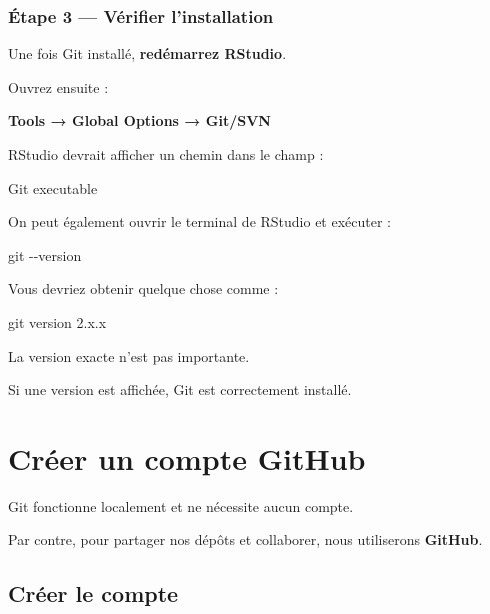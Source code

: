 \documentclass[
  letterpaper,
  DIV=11,
  numbers=noendperiod]{scrreprt}
\newenvironment{Shaded}{\begin{snugshade}}{\end{snugshade}}
\newcommand{\AttributeTok}[1]{\textcolor[rgb]{0.40,0.45,0.13}{#1}}
\newcommand{\FunctionTok}[1]{\textcolor[rgb]{0.28,0.35,0.67}{#1}}
\newcommand{\NormalTok}[1]{\textcolor[rgb]{0.00,0.23,0.31}{#1}}
\begin{document}
\subsection{Étape 3 --- Vérifier
l'installation}\label{uxe9tape-3-vuxe9rifier-linstallation}

Une fois Git installé, \textbf{redémarrez RStudio}.

Ouvrez ensuite :

\textbf{Tools → Global Options → Git/SVN}

RStudio devrait afficher un chemin dans le champ :

\begin{Shaded}
\begin{Highlighting}[]
\NormalTok{Git executable}
\end{Highlighting}
\end{Shaded}

On peut également ouvrir le terminal de RStudio et exécuter :

\begin{Shaded}
\begin{Highlighting}[]
\FunctionTok{git} \AttributeTok{{-}{-}version}
\end{Highlighting}
\end{Shaded}

Vous devriez obtenir quelque chose comme :

\begin{Shaded}
\begin{Highlighting}[]
\NormalTok{git version 2.x.x}
\end{Highlighting}
\end{Shaded}

La version exacte n'est pas importante.

Si une version est affichée, Git est correctement installé.


\chapter{Créer un compte GitHub}\label{cruxe9er-un-compte-github}

Git fonctionne localement et ne nécessite aucun compte.

Par contre, pour partager nos dépôts et collaborer, nous utiliserons
\textbf{GitHub}.

\section*{Créer le compte}\label{cruxe9er-le-compte}
\end{document}
